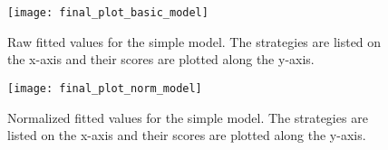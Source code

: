 \begin{figure}[H]
    \centering
    \texttt{[image: final\_plot\_basic\_model]}
    \captionsetup{justification=centering}
    \caption{Raw fitted values for the simple model. The strategies are listed
    on the x-axis and their scores are plotted along the y-axis. }
    \label{fig:recapTestsPlot}
\end{figure}

\begin{figure}[H]
    \centering
    \texttt{[image: final\_plot\_norm\_model]}
    \captionsetup{justification=centering}
    \caption{Normalized fitted values for the simple model. The strategies are listed
    on the x-axis and their scores are plotted along the y-axis. }
    \label{fig:recapTestsPlot}
\end{figure}






